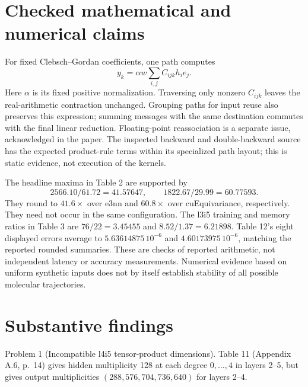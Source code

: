 \documentclass[10pt]{article}
\begin{document}
\section*{Checked mathematical and numerical claims}
For fixed Clebsch–Gordan coefficients, one path computes \[y_k=\alpha w\sum_{i,j} C_{ijk}h_i e_j.\] Here \(\alpha\) is its fixed positive normalization. Traversing only nonzero \(C_{ijk}\) leaves the real-arithmetic contraction unchanged. Grouping paths for input reuse also preserves this expression; summing messages with the same destination commutes with the final linear reduction. Floating-point reassociation is a separate issue, acknowledged in the paper. The inspected backward and double-backward source has the expected product-rule terms within its specialized path layout; this is static evidence, not execution of the kernels.\par
The headline maxima in Table 2 are supported by \[2566.10/61.72=41.57647,\qquad 1822.67/29.99=60.77593.\] They round to \(41.6\times\) over e3nn and \(60.8\times\) over cuEquivariance, respectively. They need not occur in the same configuration. The l3i5 training and memory ratios in Table 3 are \(76/22=3.45455\) and \(8.52/1.37=6.21898\). Table 12’s eight displayed errors average to \(5.63614875\,10^{-6}\) and \(4.60173975\,10^{-6}\), matching the reported rounded summaries. These are checks of reported arithmetic, not independent latency or accuracy measurements. Numerical evidence based on uniform synthetic inputs does not by itself establish stability of all possible molecular trajectories.\par
\section*{Substantive findings}
Problem 1 (Incompatible l4i5 tensor-product dimensions).  Table 11 (Appendix A.6, p. 14) gives hidden multiplicity 128 at each degree \(0,\ldots,4\) in layers 2–5, but gives output multiplicities \((288,576,704,736,640)\) for layers 2–4.\par
\end{document}
